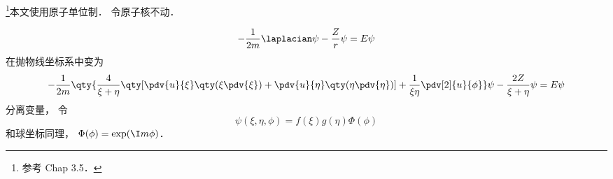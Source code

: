 
\begin{issues}
\issueDraft
\end{issues}


\footnote{参考 \cite{Brandsen} Chap 3.5．}本文使用原子单位制． 令原子核不动．

\begin{equation}
-\frac{1}{2m} \laplacian \psi - \frac{Z}{r} \psi = E\psi
\end{equation}
在抛物线坐标系中变为
\begin{equation}
-\frac{1}{2m} \qty{\frac{4}{\xi + \eta} \qty[\pdv{u}{\xi}\qty(\xi\pdv{\xi}) + \pdv{u}{\eta}\qty(\eta\pdv{\eta})] + \frac{1}{\xi\eta}\pdv[2]{u}{\phi}}\psi - \frac{2Z}{\xi + \eta}\psi = E\psi
\end{equation}
分离变量， 令
\begin{equation}
\psi(\xi, \eta, \phi) = f(\xi) g(\eta) \Phi(\phi)
\end{equation}
和球坐标同理， $\Phi(\phi) = \exp(\I m \phi)$．
